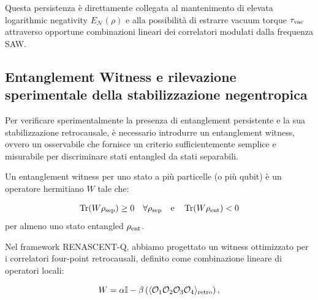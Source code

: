 \documentclass[11pt,a4paper]{article}
\theoremstyle{plain}
\theoremstyle{definition}
\begin{document}
\vspace{0.2cm}

Questa persistenza è direttamente collegata al mantenimento di elevata logarithmic negativity $E_{\mathcal{N}}(\rho)$ e alla possibilità di estrarre vacuum torque $\tau_{\rm vac}$ attraverso opportune combinazioni lineari dei correlatori modulati dalla frequenza SAW. 









\vspace{0.5cm}





\subsection{Entanglement Witness e rilevazione sperimentale della stabilizzazione negentropica}


\vspace{0.2cm}

Per verificare sperimentalmente la presenza di entanglement persistente e la sua stabilizzazione retrocausale, è necessario introdurre un entanglement witness, ovvero un osservabile che fornisce un criterio sufficientemente semplice e misurabile per discriminare stati entangled da stati separabili.


\vspace{0.3cm}

Un entanglement witness per uno stato a più particelle (o più qubit) è un operatore hermitiano $W$ tale che:

\vspace{0.2cm}
\begin{equation}
\operatorname{Tr}(W \rho_{\rm sep}) \geq 0 \quad \forall \rho_{\rm sep} \quad \text{e} \quad \operatorname{Tr}(W \rho_{\rm ent}) < 0
\label{eq:witness_definition}
\end{equation}
per almeno uno stato entangled $\rho_{\rm ent}$.

\vspace{0.3cm}

Nel framework RENASCENT-Q, abbiamo progettato un witness ottimizzato per i correlatori four-point retrocausali, definito come combinazione lineare di operatori locali:

\vspace{0.2cm}
\begin{equation}
W = \alpha \mathbb{I} - \beta \left( \langle \mathcal{O}_1 \mathcal{O}_2 \mathcal{O}_3 \mathcal{O}_4 \rangle_{\rm retro} \right),
\label{eq:witness_renascent}
\end{equation}
\end{document}
